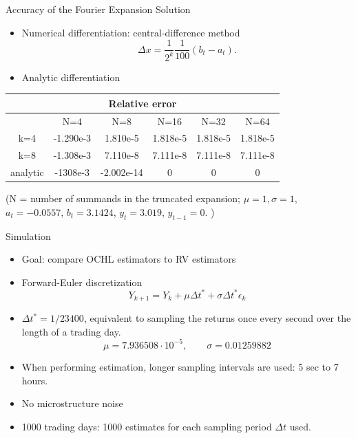 \documentclass{beamer}
\begin{document}
\begin{frame}{Accuracy of the Fourier Expansion Solution}
\begin{itemize}
	\item Numerical differentiation: central-difference method 
	\[ \Delta x = \frac{1}{2^k} \frac{1}{100} (b_t - a_t). \]
	\item Analytic differentiation
\end{itemize}

\pause
\begin{centering}
\begin{tabular}{|c|c|c|c|c|c|}
\multicolumn{6}{c}{Relative error} \\\hline
		& N=4 & N=8 & N=16 & N=32 & N=64  \\\hline
k=4 &-1.290e-3	&1.810e-5& 1.818e-5 & 1.818e-5 & 1.818e-5 \\\hline
k=8 & -1.308e-3 & 7.110e-8 & 7.111e-8  &	7.111e-8 & 7.111e-8 \\\hline
analytic & -1308e-3	& -2.002e-14&0&	0&	0 \\\hline
\end{tabular}
\end{centering}
(N = number of summands in the truncated expansion; $\mu=1, \sigma=1$, $a_t = -0.0557$, $b_t = 3.1424$, $y_t = 3.019$, $y_{t-1} = 0$. )
\end{frame}



\begin{frame}{Simulation}
	\begin{itemize}
		\item Goal: compare OCHL estimators to RV estimators
		\item Forward-Euler discretization
			\[ Y_{k+1} = Y_{k} + \mu \Delta t^* + \sigma \Delta t^* \epsilon_k \]
		\item $\Delta t^* = 1/23400$, equivalent to sampling the returns once every second over the length of a trading day.
			\[ \mu = 7.936508 \cdot 10^{-5}, \qquad \sigma = 0.01259882 \]	
		\item When performing estimation, longer sampling intervals are used: 5 sec to 7 hours.
		
		\item No microstructure noise
		
		\item 1000 trading days: 1000 estimates for each sampling period $\Delta t$ used. 
	\end{itemize}
\end{frame}
\end{document}
